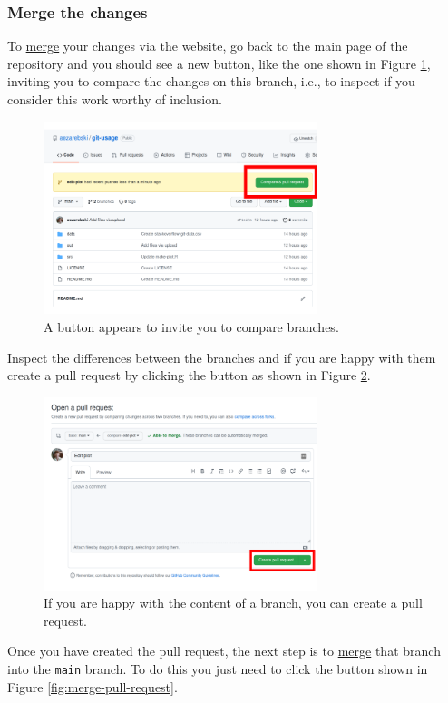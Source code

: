 \documentclass[11pt,onecolumn]{scrartcl}
\begin{document}
\subsubsection*{Merge the changes}
\label{sec:org2d4616e}

To \hyperref[sec:orgd1289e1]{merge} your changes via the website, go back to the main page of the
repository and you should see a new button, like the one shown in Figure
\ref{fig:pull-request}, inviting you to compare the changes on this branch, i.e., to
inspect if you consider this work worthy of inclusion.

\begin{figure}[htbp]
\centering
\includegraphics[width=8cm]{./pull-request.png}
\caption{\label{fig:pull-request}A button appears to invite you to compare branches.}
\end{figure}

Inspect the differences between the branches and if you are happy with them
create a pull request by clicking the button as shown in Figure
\ref{fig:create-pull-request}.

\begin{figure}[htbp]
\centering
\includegraphics[width=8cm]{./create-pull-request.png}
\caption{\label{fig:create-pull-request}If you are happy with the content of a branch, you can create a pull request.}
\end{figure}

Once you have created the pull request, the next step is to \hyperref[sec:orgd1289e1]{merge} that branch
into the \texttt{main} branch. To do this you just need to click the button shown in
Figure \ref{fig:merge-pull-request}.
\end{document}
